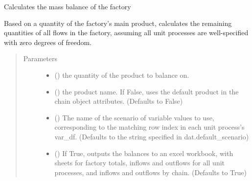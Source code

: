\documentclass[a4paper,10pt,english]{sphinxmanual}
\begin{document}
\begin{fulllineitems}
\begin{fulllineitems}
\begin{quote}
\begin{description}
\end{description}\end{quote}

\end{fulllineitems}


\begin{fulllineitems}
\label{\detokenize{factory:factory.Factory.balance}}
Calculates the mass balance of the factory

Based on a quantity of the factory’s main product, calculates the
remaining quantities of all flows in the factory, assuming all unit
processes are well-specified with zero degrees of freedom.
\begin{quote}\begin{description}
\item[{Parameters}] \leavevmode\begin{itemize}
\item {} 
 () \textendash{} the quantity of the product to balance on.

\item {} 
 () \textendash{} the product name. If False, uses the default
product in the chain object attributes.
(Defaults to False)

\item {} 
 () \textendash{} The name of the scenario of variable values to use,
corresponding to the matching row index in each unit process’s
var\_df.
(Defaults to the string specified in dat.default\_scenario)

\item {} 
 () \textendash{} If True, outputs the balances to an excel
workbook, with sheets for factory totals, inflows and outflows
for all unit processes, and inflows and outflows by chain.
(Defaults to True)


\end{itemize}
\end{description}
\end{quote}
\end{fulllineitems}
\end{fulllineitems}
\end{document}
